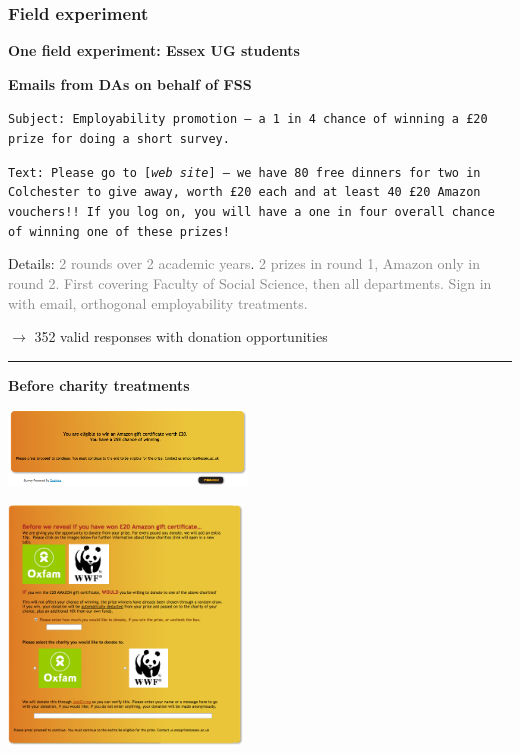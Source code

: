 \documentclass[]{article}
\begin{document}
\hypertarget{field-experiment}{%
\subsubsection{Field experiment}\label{field-experiment}}

\textbf{One field experiment: Essex UG students}

\bigskip

\textbf{Emails from DAs on behalf of FSS}

\texttt{\footnotesize Subject: Employability promotion -- a 1 in 4 chance of winning a £20 prize for doing a short survey.}
\bigskip

\texttt{\footnotesize Text: Please go to [\emph{web site}] --  we have 80 free dinners for two in Colchester to give away, worth £20 each and at least 40 £20 Amazon vouchers!! If you log on, you will have a one in four overall chance of winning one of these prizes!}

\bigskip

Details: \textcolor{gray}{2 rounds over 2 academic years}. \textcolor{gray}{2 prizes in round 1, Amazon  only in round 2.} \textcolor{gray}{First covering Faculty of Social Science, then all departments.} \textcolor{gray}{Sign in with email, orthogonal employability treatments.}

\(\rightarrow\) 352 valid responses with donation opportunities

\begin{center}\rule{0.5\linewidth}{\linethickness}\end{center}

\textbf{Before charity treatments}

\includegraphics[width=2.5in]{picsfigs/eligibleforamazon.png}

\includegraphics[height=2.5in]{picsfigs/beforeamazon.png}
\end{document}
